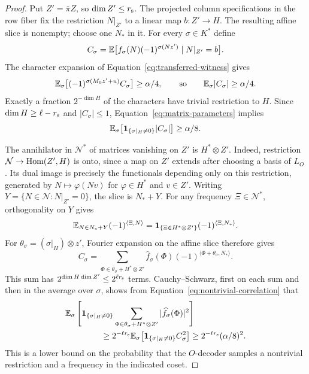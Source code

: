\begin{proof}
Put $Z'=\bar\pi Z$, so $\dim Z'\le r_{\rm s}$.  The projected column
specifications in the row fiber fix the restriction $N|_{Z'}$ to a linear
map $b:Z'\to H$.  The resulting affine slice is nonempty; choose one
$N_*$ in it.  For every $\sigma\in K^*$ define
\[
 C_\sigma=\mathbb E\bigl[f_\sigma(N)(-1)^{\sigma(Nz')}
                       \mid N|_{Z'}=b\bigr].
\]
The character expansion of Equation~\eqref{eq:transferred-witness} gives
\[
 \mathbb E_\sigma\bigl[(-1)^{\sigma(M_0z'+u)}C_\sigma\bigr]
 \ge\alpha/4,
 \qquad\text{so}\qquad
 \mathbb E_\sigma|C_\sigma|\ge\alpha/4.
\]
Exactly a fraction $2^{-\dim H}$ of the characters have trivial
restriction to $H$.  Since $\dim H\ge\ell-r_{\rm s}$ and
$|C_\sigma|\le1$, Equation~\eqref{eq:matrix-parameters} implies
\begin{equation}
 \mathbb E_\sigma\bigl[\mathbf 1_{\{\sigma|_H\ne0\}}|C_\sigma|\bigr]
 \ge\alpha/8.
 \label{eq:nontrivial-correlation}
\end{equation}

The annihilator in $\mathcal N^*$ of matrices vanishing on $Z'$ is $H^*\otimes Z'$.
Indeed, restriction $\mathcal N\to\operatorname{Hom}(Z',H)$ is onto, since a map on $Z'$
extends after choosing a basis of $L_O$.  Its dual image is precisely
the functionals depending only on this restriction, generated by
$N\mapsto\varphi(Nv)$ for $\varphi\in H^*$ and $v\in Z'$.
Writing $Y=\{N\in \mathcal N:N|_{Z'}=0\}$, the slice is $N_*+Y$.
For any frequency $\Xi\in \mathcal N^*$, orthogonality on $Y$ gives
\[
 \mathbb E_{N\in N_*+Y}(-1)^{\langle\Xi,N\rangle}
 =\mathbf1_{\{\Xi\in H^*\otimes Z'\}}
       (-1)^{\langle\Xi,N_*\rangle}.
\]
For $\theta_\sigma=(\sigma|_H)\otimes z'$, Fourier expansion on the
affine slice therefore gives
\[
 C_\sigma
 =\sum_{\Phi\in\theta_\sigma+H^*\otimes Z'}
       \widehat f_\sigma(\Phi)
       (-1)^{\langle\Phi+\theta_\sigma,N_*\rangle}.
\]
This sum has $2^{\dim H\dim Z'}\le2^{\ell r_{\rm s}}$ terms.
Cauchy--Schwarz, first on each sum and then in the average over $\sigma$,
shows from Equation~\eqref{eq:nontrivial-correlation} that
\begin{align*}
 &\E_\sigma\left[
   \mathbf 1_{\{\sigma|_H\ne0\}}
   \sum_{\Phi\in\theta_\sigma+H^*\otimes Z'}
             |\widehat f_\sigma(\Phi)|^2\right]\\
 &\hspace{15mm}\ge
 2^{-\ell r_{\rm s}}
 \E_\sigma\bigl[\mathbf 1_{\{\sigma|_H\ne0\}}C_\sigma^2\bigr]
 \ge 2^{-\ell r_{\rm s}}(\alpha/8)^2.
\end{align*}
This is a lower bound on the probability that the $O$-decoder samples a
nontrivial restriction and a frequency in the indicated coset.


\end{proof}
